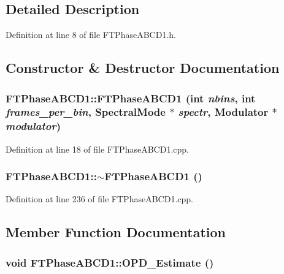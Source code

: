 \subsection{Detailed Description}


Definition at line 8 of file FTPhaseABCD1.h.



\subsection{Constructor \& Destructor Documentation}
\hypertarget{classFTPhaseABCD1_a5cbce7f05ad5e81f40f3ab40ddb3faf0}{
\subsubsection[{FTPhaseABCD1}]{\setlength{\rightskip}{0pt plus 5cm}FTPhaseABCD1::FTPhaseABCD1 (int {\em nbins}, \/  int {\em frames\_\-per\_\-bin}, \/  {\bf SpectralMode} $\ast$ {\em spectr}, \/  {\bf Modulator} $\ast$ {\em modulator})}}
\label{classFTPhaseABCD1_a5cbce7f05ad5e81f40f3ab40ddb3faf0}


Definition at line 18 of file FTPhaseABCD1.cpp.

\hypertarget{classFTPhaseABCD1_adca39b254b058fc6ebc624354bec5255}{
\subsubsection[{$\sim$FTPhaseABCD1}]{\setlength{\rightskip}{0pt plus 5cm}FTPhaseABCD1::$\sim$FTPhaseABCD1 ()}}
\label{classFTPhaseABCD1_adca39b254b058fc6ebc624354bec5255}


Definition at line 236 of file FTPhaseABCD1.cpp.



\subsection{Member Function Documentation}
\hypertarget{classFTPhaseABCD1_a2b378a7f7486447bd702fece1f2b6ba3}{
\subsubsection[{OPD\_\-Estimate}]{\setlength{\rightskip}{0pt plus 5cm}void FTPhaseABCD1::OPD\_\-Estimate ()}}
\label{classFTPhaseABCD1_a2b378a7f7486447bd702fece1f2b6ba3}



